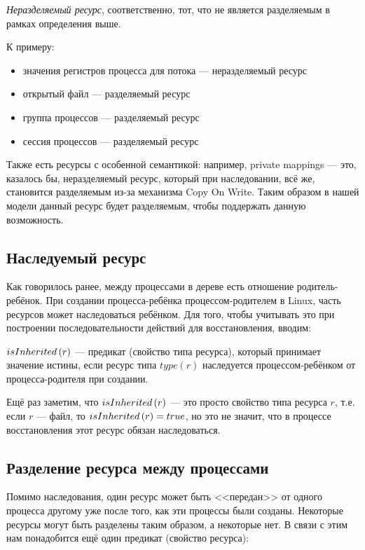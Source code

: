\emph{Неразделяемый ресурс}, соответственно, тот, что не является разделяемым в рамках определения выше.

К примеру: 
\begin{itemize}
	\item значения регистров процесса для потока --- неразделяемый ресурс
	\item открытый файл --- разделяемый ресурс
	\item группа процессов --- разделяемый ресурс
	\item сессия процессов --- разделяемый ресурс
\end{itemize}

Также есть ресурсы с особенной семантикой: например, private mappings --- это, казалось бы, неразделяемый ресурс, который при наследовании, всё же, становится разделяемым из-за механизма Copy On Write. Таким образом в нашей модели данный ресурс будет разделяемым, чтобы поддержать данную возможность.

\subsection{Наследуемый ресурс}
\label{chap2:subsec:inherres}

Как говорилось ранее, между процессами в дереве есть отношение родитель-ребёнок. При создании процесса-ребёнка 
процессом-родителем в Linux, часть ресурсов может наследоваться ребёнком. Для того, чтобы учитывать это при 
построении последовательности действий для восстановления, вводим:

\begin{defn}
\label{def:isinherited}
$isInherited\left( r \right)$ --- предикат (свойство типа ресурса), который принимает значение истины, если ресурс типа 
$type(r)$ наследуется процессом-ребёнком от процесса-родителя при создании.
\end{defn}

Ещё раз заметим, что $isInherited\left( r \right)$ --- это просто свойство типа ресурса $r$, т.е. если $r$ --- файл, то 
$isInherited\left( r \right) = true$, но это не значит, что в процессе восстановления этот ресурс обязан наследоваться.

\subsection{Разделение ресурса между процессами}
\label{chap2:subsec:shareres}

Помимо наследования, один ресурс может быть <<передан>> от одного процесса другому уже после того, как эти процессы 
были созданы. Некоторые ресурсы могут быть разделены таким образом, а некоторые нет. В связи с этим нам понадобится 
ещё один предикат (свойство ресурса):

